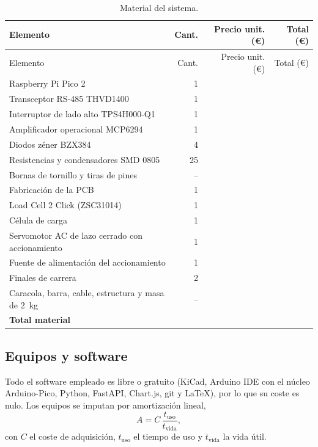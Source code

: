 \begin{longtable}{@{}L{0.42\textwidth}rrr@{}}
\caption{Material del sistema.}\label{tab:material}\\
\toprule
Elemento & Cant. & Precio unit. (€) & Total (€) \\
\midrule
\endfirsthead
\toprule
Elemento & Cant. & Precio unit. (€) & Total (€) \\
\midrule
\endhead
Raspberry Pi Pico 2 & 1 & \completar{} & \\
Transceptor RS-485 THVD1400 & 1 & \completar{} & \\
Interruptor de lado alto TPS4H000-Q1 & 1 & \completar{} & \\
Amplificador operacional MCP6294 & 1 & \completar{} & \\
Diodos zéner BZX384 & 4 & \completar{} & \\
Resistencias y condensadores SMD 0805 & 25 & \completar{} & \\
Bornas de tornillo y tiras de pines & -- & \completar{} & \\
Fabricación de la PCB & 1 & \completar{} & \\
Load Cell 2 Click (ZSC31014) & 1 & \completar{} & \\
Célula de carga & 1 & \completar{} & \\
Servomotor AC de lazo cerrado con accionamiento & 1 & \completar{} & \\
Fuente de alimentación del accionamiento & 1 & \completar{} & \\
Finales de carrera & 2 & \completar{} & \\
Caracola, barra, cable, estructura y masa de \SI{2}{\kilo\gram} & -- & \completar{} & \\
\midrule
\textbf{Total material} & & & \completar{} \\
\bottomrule
\end{longtable}

\subsection{Equipos y software}

Todo el software empleado es libre o gratuito (KiCad, Arduino IDE con el núcleo Arduino-Pico,
Python, FastAPI, Chart.js, git y \LaTeX), por lo que su coste es nulo. Los equipos se imputan por
amortización lineal,
\begin{equation}
  A = C\,\frac{t_{\text{uso}}}{t_{\text{vida}}},
\end{equation}
con $C$ el coste de adquisición, $t_{\text{uso}}$ el tiempo de uso y $t_{\text{vida}}$ la vida útil.

